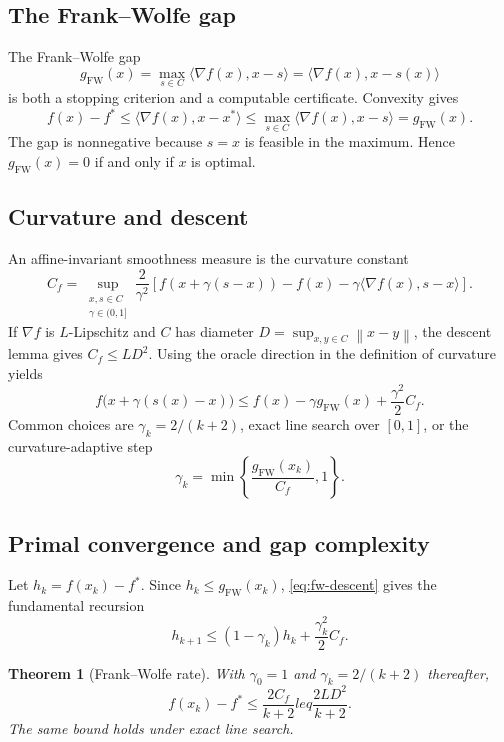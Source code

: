 \documentclass[12pt,oneside]{book}
\numberwithin{equation}{section}
\theoremstyle{definition}
\theoremstyle{plain}
\newtheorem{theorem}{Theorem}[section]
\theoremstyle{remark}
\newcommand{\norm}[1]{\left\lVert #1 \right\rVert}
\begin{document}
\subsection{The Frank--Wolfe gap}

The Frank--Wolfe gap
\[
    g_{\mathrm{FW}}(x)=
    \max_{s\in C}\langle\nabla f(x),x-s\rangle
    =\langle\nabla f(x),x-s(x)\rangle
\]
is both a stopping criterion and a computable certificate. Convexity gives
\[
 f(x)-f^*\leq\langle\nabla f(x),x-x^*\rangle
 \leq\max_{s\in C}\langle\nabla f(x),x-s\rangle=g_{\mathrm{FW}}(x).
\]
The gap is nonnegative because $s=x$ is feasible in the maximum. Hence
$g_{\mathrm{FW}}(x)=0$ if and only if $x$ is optimal.

\subsection{Curvature and descent}

An affine-invariant smoothness measure is the curvature constant
\[
 C_f=\sup_{\substack{x,s\in C\\\gamma\in(0,1]}}
 \frac{2}{\gamma^2}\left[f(x+\gamma(s-x))-f(x)
 -\gamma\langle\nabla f(x),s-x\rangle\right].
\]
If $\nabla f$ is $L$-Lipschitz and $C$ has diameter
$D=\sup_{x,y\in C}\norm{x-y}$, the descent lemma gives $C_f\leq LD^2$.
Using the oracle direction in the definition of curvature yields
\begin{equation}\label{eq:fw-descent}
 f\bigl(x+\gamma(s(x)-x)\bigr)
 \leq f(x)-\gamma g_{\mathrm{FW}}(x)+\frac{\gamma^2}{2}C_f.
\end{equation}
Common choices are $\gamma_k=2/(k+2)$, exact line search over $[0,1]$, or
the curvature-adaptive step
\[
 \gamma_k=\min\left\{\frac{g_{\mathrm{FW}}(x_k)}{C_f},1\right\}.
\]

\subsection{Primal convergence and gap complexity}

Let $h_k=f(x_k)-f^*$. Since $h_k\leq g_{\mathrm{FW}}(x_k)$,
\eqref{eq:fw-descent} gives the fundamental recursion
\begin{equation}\label{eq:fw-recursion}
 h_{k+1}\leq(1-\gamma_k)h_k+\frac{\gamma_k^2}{2}C_f.
\end{equation}

\begin{theorem}[Frank--Wolfe rate]
With $\gamma_0=1$ and $\gamma_k=2/(k+2)$ thereafter,
\[
    f(x_k)-f^*\leq\frac{2C_f}{k+2}leq\frac{2LD^2}{k+2}.
\]
The same bound holds under exact line search.
\end{theorem}
\end{document}

